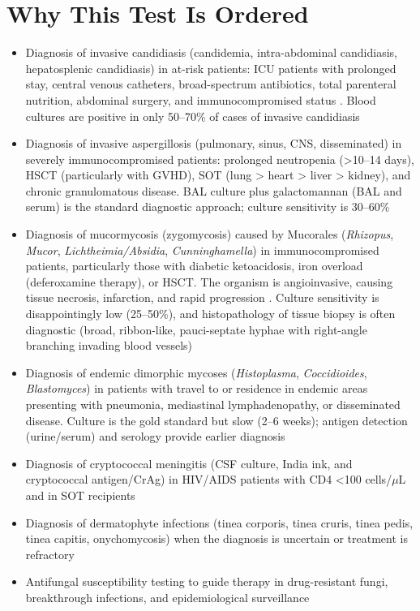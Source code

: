 \section*{Why This Test Is Ordered}
\begin{itemize}
  \item Diagnosis of invasive candidiasis (candidemia, intra-abdominal candidiasis, hepatosplenic candidiasis) in at-risk patients: ICU patients with prolonged stay, central venous catheters, broad-spectrum antibiotics, total parenteral nutrition, abdominal surgery, and immunocompromised status \cite{pappas2016clinical}. Blood cultures are positive in only 50--70\% of cases of invasive candidiasis
  \item Diagnosis of invasive aspergillosis (pulmonary, sinus, CNS, disseminated) in severely immunocompromised patients: prolonged neutropenia (>10--14 days), HSCT (particularly with GVHD), SOT (lung > heart > liver > kidney), and chronic granulomatous disease. BAL culture plus galactomannan (BAL and serum) is the standard diagnostic approach; culture sensitivity is 30--60\% \cite{patterson2016practice}
  \item Diagnosis of mucormycosis (zygomycosis) caused by Mucorales (\textit{Rhizopus}, \textit{Mucor}, \textit{Lichtheimia/Absidia}, \textit{Cunninghamella}) in immunocompromised patients, particularly those with diabetic ketoacidosis, iron overload (deferoxamine therapy), or HSCT. The organism is angioinvasive, causing tissue necrosis, infarction, and rapid progression \cite{cornely2019global}. Culture sensitivity is disappointingly low (25--50\%), and histopathology of tissue biopsy is often diagnostic (broad, ribbon-like, pauci-septate hyphae with right-angle branching invading blood vessels)
  \item Diagnosis of endemic dimorphic mycoses (\textit{Histoplasma}, \textit{Coccidioides}, \textit{Blastomyces}) in patients with travel to or residence in endemic areas presenting with pneumonia, mediastinal lymphadenopathy, or disseminated disease. Culture is the gold standard but slow (2--6 weeks); antigen detection (urine/serum) and serology provide earlier diagnosis
  \item Diagnosis of cryptococcal meningitis (CSF culture, India ink, and cryptococcal antigen/CrAg) in HIV/AIDS patients with CD4 <100 cells/$\mu$L and in SOT recipients
  \item Diagnosis of dermatophyte infections (tinea corporis, tinea cruris, tinea pedis, tinea capitis, onychomycosis) when the diagnosis is uncertain or treatment is refractory
  \item Antifungal susceptibility testing to guide therapy in drug-resistant fungi, breakthrough infections, and epidemiological surveillance
\end{itemize}

